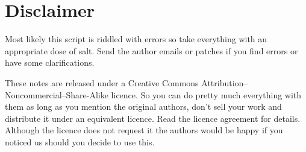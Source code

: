 \section*{Disclaimer}

Most likely this script is riddled with errors so take everything with an appropriate dose of salt. Send the author emails or patches if you find errors or have some clarifications. 

These notes are released under a Creative Commons Attribution--Noncommercial--Share-Alike licence. So you can do pretty much everything with them as long as you mention the original authors, don't sell your work and distribute it under an equivalent licence. Read the licence agreement for details. Although the licence does not request it the authors would be happy if you noticed us should you decide to use this.
\newpage